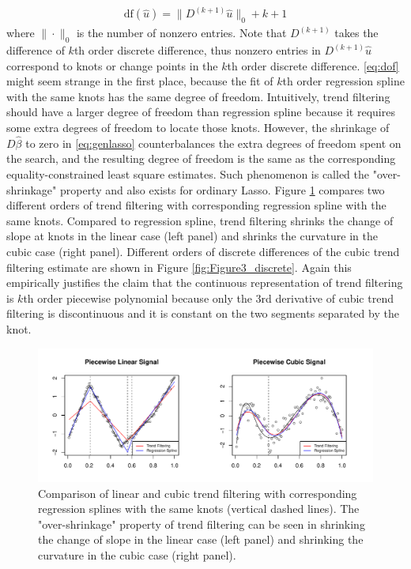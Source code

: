 \documentclass[a4paper]{article}
\begin{document}
\begin{align}
\mbox{df}(\hat{u}) = \|D^{(k+1)}\hat{u}\|_0 + k + 1 \label{eq:dof}
\end{align}
where $\|\cdot\|_0$ is the number of nonzero entries. Note that $D^{(k+1)}$ takes the difference of $k$th order discrete difference, thus nonzero entries in $D^{(k+1)}\hat{u}$ correspond to knots or change points in the $k$th order discrete difference. \eqref{eq:dof} might seem strange in the first place, because the fit of $k$th order regression spline with the same knots has the same degree of freedom. Intuitively, trend filtering should have a larger degree of freedom than regression spline because it requires some extra degrees of freedom to locate those knots. However, the shrinkage of $D\hat{\beta}$ to zero in \eqref{eq:genlasso} counterbalances the extra degrees of freedom spent on the search, and the resulting degree of freedom is the same as the corresponding equality-constrained least square estimates. Such phenomenon is called the "over-shrinkage" property and also exists for ordinary Lasso. Figure \ref{fig:Figure2_overshrinkage} compares two different orders of trend filtering with corresponding regression spline with the same knots. Compared to regression spline, trend filtering shrinks the change of slope at knots in the linear case (left panel) and shrinks the curvature in the cubic case (right panel). Different orders of discrete differences of the cubic trend filtering estimate are shown in Figure \ref{fig:Figure3_discrete}. Again this empirically justifies the claim that the continuous representation of trend filtering is $k$th order piecewise polynomial because only the $3$rd derivative of cubic trend filtering is discontinuous and it is constant on the two segments separated by the knot.  

\begin{figure}[t!]
\centering
\includegraphics[width = 1.0\textwidth]{Figures/Figure2.pdf}
\caption{Comparison of linear and cubic trend filtering with corresponding regression splines with the same knots (vertical dashed lines). The "over-shrinkage" property of trend filtering can be seen in shrinking the change of slope in the linear case (left panel) and shrinking the curvature in the cubic case (right panel).}
\label{fig:Figure2_overshrinkage}
\end{figure}
\end{document}
